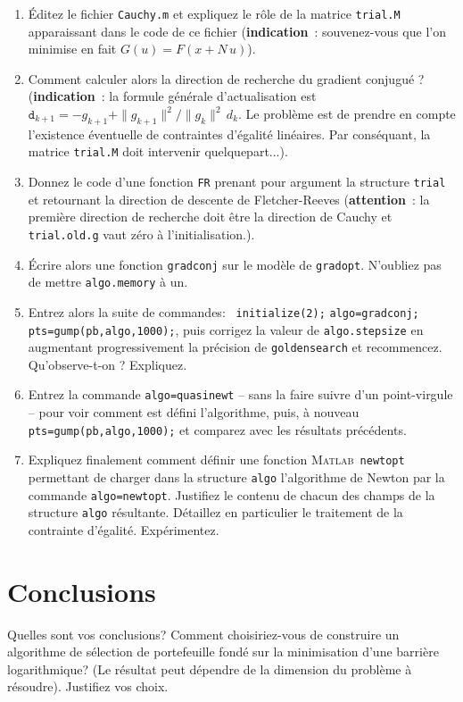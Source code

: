 \documentclass[10pt,a4paper,fleqn]{report}
\newcommand{\matlab}{\textsc{Matlab}}
\newcommand{\onit}{\begin{enumerate}}
\newcommand{\offit}{\end{enumerate}}
\renewcommand{\tt}{\texttt}
\begin{document}
\onit
\item \'Editez le fichier \tt{Cauchy.m} et expliquez le r\^ole de la matrice \texttt{trial.M} apparaissant dans le code de ce fichier (\textbf{indication}~: souvenez-vous que l'on minimise en fait $G(u)=F(x+N\,u)$).
\item Comment calculer alors la direction de recherche du gradient conjugu\'e ? (\textbf{indication}~: la formule g\'en\'erale d'actualisation est $\mathtt d_{k+1}=-g_{k+1}+\|g_{k+1}\|^2/\|g_k\|^2\,d_k$. Le probl\`eme est de prendre en compte l'existence \'eventuelle de contraintes d'\'egalit\'e lin\'eaires. Par cons\'equant, la matrice \tt{trial.M} doit intervenir quelquepart...).
 \item Donnez le code d'une fonction \texttt{FR} prenant pour argument la structure \texttt{trial} et retournant la direction de  descente de Fletcher-Reeves (\textbf{attention}~: la premi\`ere direction de recherche doit \^etre la direction de Cauchy et \tt{trial.old.g}  vaut z\'ero \`a  l'initialisation.).
\item \'Ecrire alors une fonction \tt{gradconj} sur le mod\`ele de \tt{gradopt}. N'oubliez pas de mettre \tt{algo.memory} \`a  un.
\item Entrez alors la suite de commandes:
\tt{ initialize(2);} \tt{algo=gradconj;} \tt{pts=gump(pb,algo,1000);},
puis corrigez la valeur de \texttt{algo.stepsize} en augmentant progressivement la pr\'ecision de \texttt{goldensearch} et recommencez. Qu'observe-t-on ? Expliquez.
\item Entrez la commande \tt{algo=quasinewt} -- sans la faire suivre d'un point-virgule -- pour voir comment est d\'efini l'algorithme, puis, à nouveau \tt{pts=gump(pb,algo,1000);} et comparez avec les résultats précédents.
\item Expliquez finalement comment définir une fonction \matlab\ \tt{newtopt} permettant de charger dans la structure \tt{algo} l'algorithme de Newton par la commande \tt{algo=newtopt}. Justifiez le contenu de chacun des champs de la structure \tt{algo} résultante. Détaillez en particulier le traitement de la contrainte d'égalité. Expérimentez.

\offit

\section{Conclusions}

\bigskip

Quelles sont vos conclusions? Comment choisiriez-vous de construire un algorithme  de sélection de portefeuille fondé sur la minimisation d'une barrière logarithmique? (Le résultat peut dépendre de la dimension du problème à résoudre). Justifiez vos choix.
\end{document}
